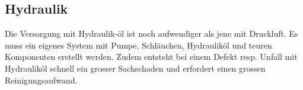 \subsection{Hydraulik}
Die Versorgung mit Hydraulik-öl ist noch aufwendiger als jene mit Druckluft. Es muss ein eigenes System mit Pumpe, Schläuchen, Hydrauliköl und teuren Komponenten erstellt werden. Zudem entsteht bei einem Defekt resp. Unfall mit Hydrauliköl schnell ein grosser Sachschaden und erfordert einen grossen Reinigungsaufwand. 

